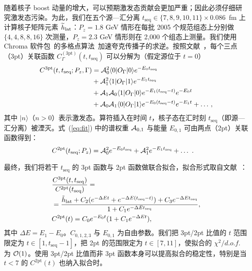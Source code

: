 随着核子 boost 动量的增大，可以预期激发态贡献会更加严重；因此必须仔细研究激发态污染。为此，我们在五个源—汇分离 $t_\text{seq}\in\{7,8,9,10,11\}\times 0.086$~fm 上计算核子矩阵元素 $\widetilde{h}_{\rm lat}$：$P_z=1.8$ GeV 情形在每批 2005 个规范组态上分别做 $\{4,4,8,8,16\}$ 次测量，$P_z=2.3$ GeV 情形则在 2,000 个组态上测量。我们使用 Chroma 软件包~\cite{Edwards:2004sx}的多格点算法~\cite{Babich:2010qb,Osborn:2010mb}加速夸克传播子的求逆。按照文献~\cite{Bhattacharya:2013ehc}，每个三点（3pt）关联函数 $C_\Gamma^{(3\text{pt})} (t, t_\text{seq})$ 可以分解为（假定源位于 $t= 0$）
\begin{align} \label{eq:fit}
C^\text{3pt}(t,t_\text{seq}; P_z, {\Gamma}) &=
   {\cal A}_0^2 \langle 0 | O_\Gamma | 0 \rangle  e^{-E_0t_\text{seq}} \\
   &+{\cal A}_1^2 \langle 1 | O_\Gamma | 1 \rangle  e^{-E_1t_\text{seq}} \nonumber\\
   &+{\cal A}_1{\cal A}_0 \langle 1 |O_\Gamma | 0 \rangle  e^{-E_1 (t_\text{seq}-t)} e^{-E_0 t} \nonumber\\
   &+{\cal A}_0{\cal A}_1 \langle 0 | O_\Gamma | 1 \rangle  e^{-E_0 (t_\text{seq}-t)} e^{-E_1 t} + \ldots \,,\nonumber
\end{align}
其中 $|n\rangle$（$n > 0$）表示激发态。算符插入在时间 $t$，核子态在汇时刻 $t_\text{seq}$（即源—汇分离）被湮灭。式~(\ref{eq:fit}) 中的谱权重 ${\cal A}_{0,1}$ 与能量 $E_{0,1}$ 可由两点（2pt）关联函数得到：
\begin{align} \label{eq:fit2}
C^\text{2pt}(t_\text{seq}; P_z) &=
   {\cal A}_0^2 e^{-E_0t_\text{seq}} +{\cal A}_1^2 e^{-E_1t_\text{seq}} + \ldots\ .
\end{align}

最终，我们将若干 $t_\text{seq}$ 的 3pt 函数与 2pt 函数做联合拟合，拟合形式取自文献~\cite{Bhattacharya:2013ehc}：
\begin{align}
&\frac{C^\text{3pt}(t,t_\text{seq})}{C^\text{2pt}(t_\text{seq})}= \nonumber\\
&=\frac{\tilde{h}_{\text{lat}}+C_2(e^{-\Delta Et}+e^{-\Delta E(t_\text{seq}-t)})+C_3e^{-\Delta E t_\text{seq}}}{1+C_1 e^{-\Delta Et_\text{seq}}},\nonumber\\
&C^\text{2pt}(t)=C_0e^{-E_0t}(1+C_1 e^{-\Delta Et}),
\end{align}
其中 $\Delta E= E_1-E_0$。$C_{0,1,2,3}$ 与 $E_{0,1}$ 为自由参数。我们把 3pt/2pt 比值的 $t$ 范围限定为 $t\in[1,t_\text{seq}-1]$，把 2pt 的范围限定为 $t\in[7, 11]$，使拟合的 $\chi^2/d.o.f.$ 为 ${\cal O} (1)$。使用 3pt/2pt 比值而非 3pt 函数本身可以提高拟合的稳定性，特别是当 $t<7$ 的 $C^\text{2pt}(t)$ 也纳入拟合时。

